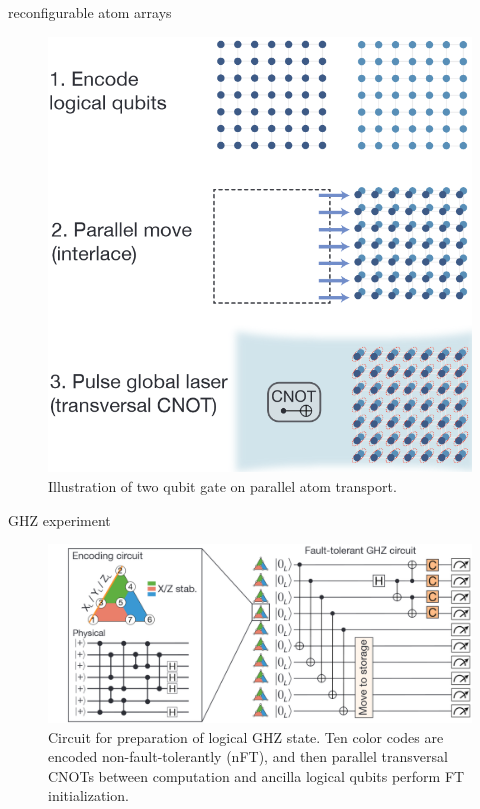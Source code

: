 \documentclass[18 pt]{beamer}
\begin{document}
\begin{frame}{reconfigurable atom arrays}
  \begin{figure}
    \includegraphics[width=.5\textwidth]{IMG/reconfigure.png}
    \caption{Illustration of two qubit gate on parallel atom transport.}
  \end{figure}
\end{frame}
\begin{frame}{GHZ experiment}
\begin{figure}
  \includegraphics[width=.8\textwidth]{IMG/ghz.png}
  \caption{Circuit for preparation of logical GHZ state. Ten color codes are encoded non-fault-tolerantly (nFT), and then parallel transversal CNOTs between computation and ancilla logical qubits perform FT initialization.}
\end{figure}
\end{frame}
\begin{frame}{}
\end{frame}
\end{document}
